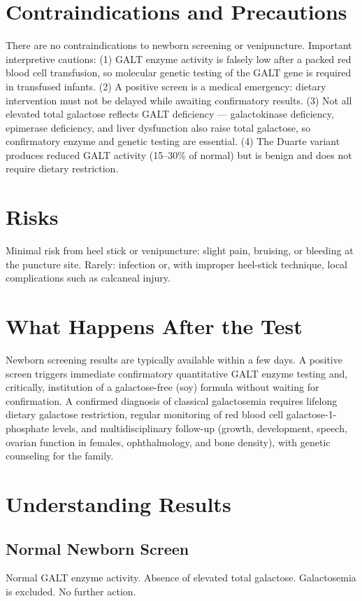 \section*{Contraindications and Precautions}
There are no contraindications to newborn screening or venipuncture. Important interpretive cautions: (1) GALT enzyme activity is falsely low after a packed red blood cell transfusion, so molecular genetic testing of the GALT gene is required in transfused infants. (2) A positive screen is a medical emergency: dietary intervention must not be delayed while awaiting confirmatory results. (3) Not all elevated total galactose reflects GALT deficiency --- galactokinase deficiency, epimerase deficiency, and liver dysfunction also raise total galactose, so confirmatory enzyme and genetic testing are essential. (4) The Duarte variant produces reduced GALT activity (15--30\% of normal) but is benign and does not require dietary restriction.

\section*{Risks}
Minimal risk from heel stick or venipuncture: slight pain, bruising, or bleeding at the puncture site. Rarely: infection or, with improper heel-stick technique, local complications such as calcaneal injury.

\section*{What Happens After the Test}
Newborn screening results are typically available within a few days. A positive screen triggers immediate confirmatory quantitative GALT enzyme testing and, critically, institution of a galactose-free (soy) formula without waiting for confirmation. A confirmed diagnosis of classical galactosemia requires lifelong dietary galactose restriction, regular monitoring of red blood cell galactose-1-phosphate levels, and multidisciplinary follow-up (growth, development, speech, ovarian function in females, ophthalmology, and bone density), with genetic counseling for the family.

\section*{Understanding Results}

\subsection*{Normal Newborn Screen}
Normal GALT enzyme activity. Absence of elevated total galactose. Galactosemia is excluded. No further action.

